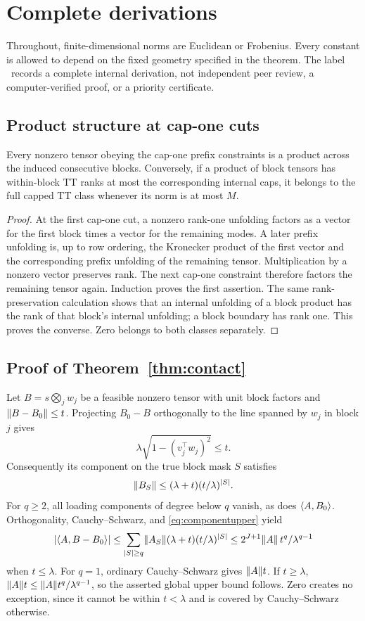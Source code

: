 \section{Complete derivations}\label{app:proofs}
Throughout, finite-dimensional norms are Euclidean or Frobenius. Every constant is allowed to depend on the fixed geometry specified in the theorem. The label \pr\ records a complete internal derivation, not independent peer review, a computer-verified proof, or a priority certificate.

\subsection{Product structure at cap-one cuts}
\begin{lemma}\label{lem:blocks}
Every nonzero tensor obeying the cap-one prefix constraints is a product across the induced consecutive blocks. Conversely, if a product of block tensors has within-block TT ranks at most the corresponding internal caps, it belongs to the full capped TT class whenever its norm is at most $M$.
\end{lemma}
\begin{proof}
At the first cap-one cut, a nonzero rank-one unfolding factors as a vector for the first block times a vector for the remaining modes. A later prefix unfolding is, up to row ordering, the Kronecker product of the first vector and the corresponding prefix unfolding of the remaining tensor. Multiplication by a nonzero vector preserves rank. The next cap-one constraint therefore factors the remaining tensor again. Induction proves the first assertion. The same rank-preservation calculation shows that an internal unfolding of a block product has the rank of that block's internal unfolding; a block boundary has rank one. This proves the converse. Zero belongs to both classes separately.
\end{proof}

\subsection{Proof of Theorem~\ref{thm:contact}}
Let $B=s\bigotimes_j w_j$ be a feasible nonzero tensor with unit block factors and $\lVert B-B_0\rVert\le t$. Projecting $B_0-B$ orthogonally to the line spanned by $w_j$ in block $j$ gives
\[
 \lambda\sqrt{1-(v_j^\top w_j)^2}\le t.
\]
Consequently its component on the true block mask $S$ satisfies
\begin{equation}\label{eq:componentupper}
 \lVert B_S\rVert\le(\lambda+t)(t/\lambda)^{|S|}.
\end{equation}
For $q\ge2$, all loading components of degree below $q$ vanish, as does $\langle A,B_0\rangle$. Orthogonality, Cauchy--Schwarz, and \eqref{eq:componentupper} yield
\[
 |\langle A,B-B_0\rangle|\le
 \sum_{|S|\ge q}\lVert A_S\rVert(\lambda+t)(t/\lambda)^{|S|}
 \le 2^{J+1}\lVert A\rVert\,t^q/\lambda^{q-1}
\]
when $t\le\lambda$. For $q=1$, ordinary Cauchy--Schwarz gives $\lVert A\rVert t$. If $t\ge\lambda$, $\lVert A\rVert t\le\lVert A\rVert t^q/\lambda^{q-1}$, so the asserted global upper bound follows. Zero creates no exception, since it cannot be within $t<\lambda$ and is covered by Cauchy--Schwarz otherwise.

